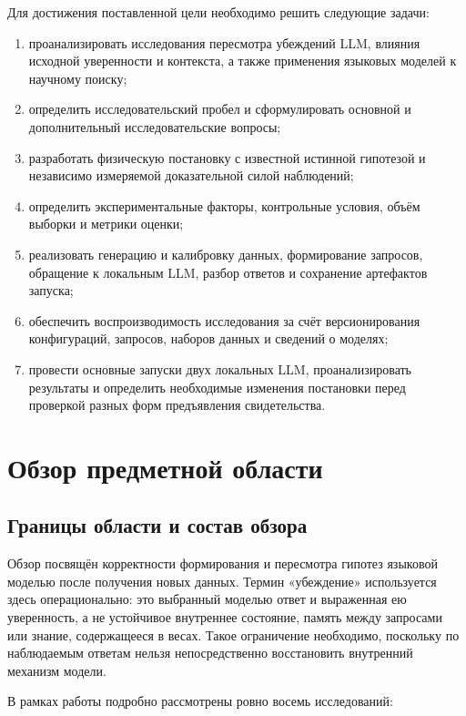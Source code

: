\documentclass[a4paper,14pt]{extarticle}
\begin{document}
Для достижения поставленной цели необходимо решить следующие задачи:

\begin{enumerate}
  \item проанализировать исследования пересмотра убеждений LLM, влияния исходной уверенности и контекста, а также применения языковых моделей к научному поиску;
  \item определить исследовательский пробел и сформулировать основной и дополнительный исследовательские вопросы;
  \item разработать физическую постановку с известной истинной гипотезой и независимо измеряемой доказательной силой наблюдений;
  \item определить экспериментальные факторы, контрольные условия, объём выборки и метрики оценки;
  \item реализовать генерацию и калибровку данных, формирование запросов, обращение к локальным LLM, разбор ответов и сохранение артефактов запуска;
  \item обеспечить воспроизводимость исследования за счёт версионирования конфигураций, запросов, наборов данных и сведений о моделях;
  \item провести основные запуски двух локальных LLM, проанализировать результаты и определить необходимые изменения постановки перед проверкой разных форм предъявления свидетельства.
\end{enumerate}

\section{Обзор предметной области}

\subsection{Границы области и состав обзора}

Обзор посвящён корректности формирования и пересмотра гипотез языковой моделью после получения новых данных. Термин «убеждение» используется здесь операционально: это выбранный моделью ответ и выраженная ею уверенность, а не устойчивое внутреннее состояние, память между запросами или знание, содержащееся в весах. Такое ограничение необходимо, поскольку по наблюдаемым ответам нельзя непосредственно восстановить внутренний механизм модели.

В рамках работы подробно рассмотрены ровно восемь исследований:
\end{document}
